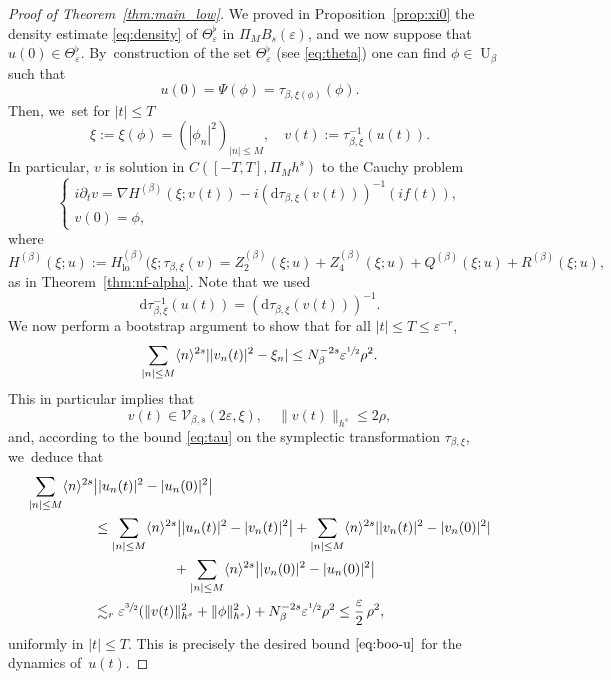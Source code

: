 \documentclass[10pt,a4paper]{amsart}
\theoremstyle{plain}
\theoremstyle{definition}
\DeclareMathOperator{\lo}{lo}
\newcommand{\1}{\mathbf{1}}
\let\epsilon\varepsilon
\begin{document}
\begin{proof}[Proof of Theorem~\ref{thm:main_low}]
We proved in Proposition~\ref{prop:xi0} the density estimate \eqref{eq:density} of $\Theta_{\epsilon}^{\flat}$ in $\Pi_{M}B_{s}(\epsilon)$, and we now suppose that $u(0)\in\Theta_{\epsilon}^{\flat}$. By~construction of the set $\Theta_{\epsilon}^{\flat}$ (see \eqref{eq:theta}) one can find $\phi\in\operatorname{U}_{\beta}$ such that
\[
u(0) = \Psi(\phi) = \tau_{\beta,\xi(\phi)}(\phi).
\]
Then, we~set for $|t|\leq T$
\[
\xi:=\xi(\phi)=(|\phi_{n}|^{2})_{|n|\leq M},\quad v(t) := \tau_{\beta,\xi}^{-1}(u(t)).
\]
In particular, $v$ is solution in $C([-T,T],\Pi_{M}h^{s})$ to the Cauchy problem
\begin{equation}
\label{eq:cau-v}
\begin{cases}
i\partial_{t}v = \nabla H^{(\beta)}(\xi;v(t)) - i(\mathrm{d}\tau_{\beta,\xi}(v(t)))^{-1}(if(t)),\\
v(0) = \phi,
\end{cases}
\end{equation}
where
\[
H^{(\beta)}(\xi;u) := H_{\lo}^{(\beta)}(\xi;\tau_{\beta,\xi}(v) = Z_{2}^{(\beta)}(\xi;u)+Z_{4}^{(\beta)}(\xi;u)+Q^{(\beta)}(\xi;u)+R^{(\beta)}(\xi;u),
\]
as in Theorem~\ref{thm:nf-alpha}. Note that we used
\[
\mathrm{d}\tau_{\beta,\xi}^{-1}(u(t)) = (\mathrm{d}\tau_{\beta,\xi}(v(t)))^{-1}.
\]
We now perform a bootstrap argument to show that for all $|t|\leq T\leq \epsilon^{-r}$,
\begin{equation}
\label{eq:boo-v}
\sum_{|n|\leq M}\langle n\rangle^{2s}||v_{n}(t)|^{2} - \xi_{n}| \leq N_{\beta}^{-2s}\epsilon^{\sfrac{1}{2}}\rho^{2}.
\end{equation}
This in particular implies that
\begin{equation}
\label{eq:boo-v-c}
v(t)\in\mathcal{V}_{\beta,s}(2\epsilon,\xi),\quad \|v(t)\|_{h^{s}}\leq 2\rho,
\end{equation}
and, according to the bound \eqref{eq:tau} on the symplectic transformation $\tau_{\beta,\xi}$, we~deduce that
\begin{align*}
\sum_{|n|\leq M}\langle n\rangle^{2s}&\bigl||u_{n}(t)|^{2} - |u_{n}(0)|^{2}\bigr| \\
&\leq
\sum_{|n|\leq M}\langle n\rangle^{2s}\bigl||u_{n}(t)|^{2} - |v_{n}(t)|^{2}\bigr|+ \sum_{|n|\leq M}\langle n\rangle^{2s}||v_{n}(t)|^{2} - |v_{n}(0)|^{2}| \\
&\hspace*{2cm}+
\sum_{|n|\leq M}\langle n\rangle^{2s}\bigl||v_{n}(0)|^{2} - |u_{n}(0)|^{2}\bigr| \\
&\lesssim_{r}
\epsilon^{\sfrac{3}{2}}(\|v(t)\|_{h^{s}}^{2}+\|\phi\|_{h^{s}}^{2}) + N_{\beta}^{-2s}\epsilon^{\sfrac{1}{2}}\rho^{2} \leq \frac{\epsilon}{2}\,\rho^{2},
\end{align*}
uniformly in $|t|\leq T$. This is precisely the desired bound $\eqref{eq:boo-u}$ for the dynamics of~$u(t)$.


\end{proof}
\end{document}
